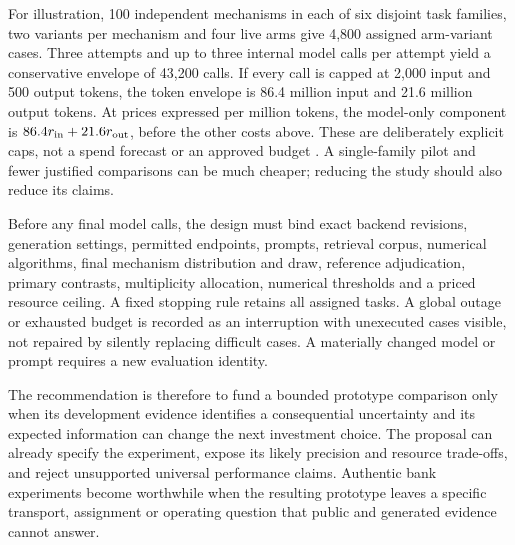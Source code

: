 For illustration, 100 independent mechanisms in each of six disjoint
task families, two variants per mechanism and four live arms give 4,800
assigned arm-variant cases. Three attempts and up to three internal
model calls per attempt yield a conservative envelope of 43,200 calls.
If every call is capped at 2,000 input and 500 output tokens, the token
envelope is 86.4 million input and 21.6 million output tokens. At prices
expressed per million tokens, the model-only component is
\(86.4r_{\rm in}+21.6r_{\rm out}\), before the other costs above. These
are deliberately explicit caps, not a spend forecast or an approved
budget \citep{exec13_live_planning}. A single-family pilot and fewer
justified comparisons can be much cheaper; reducing the study should
also reduce its claims.

Before any final model calls, the design must bind exact backend
revisions, generation settings, permitted endpoints, prompts, retrieval
corpus, numerical algorithms, final mechanism distribution and draw,
reference adjudication, primary contrasts, multiplicity allocation,
numerical thresholds and a priced resource ceiling. A fixed stopping
rule retains all assigned tasks. A global outage or exhausted budget is
recorded as an interruption with unexecuted cases visible, not repaired
by silently replacing difficult cases. A materially changed model or
prompt requires a new evaluation identity.

The recommendation is therefore to fund a bounded prototype comparison
only when its development evidence identifies a consequential
uncertainty and its expected information can change the next investment
choice. The proposal can already specify the experiment, expose its
likely precision and resource trade-offs, and reject unsupported
universal performance claims. Authentic bank experiments become
worthwhile when the resulting prototype leaves a specific transport,
assignment or operating question that public and generated evidence
cannot answer.

\label{exec13:live-design-end}
